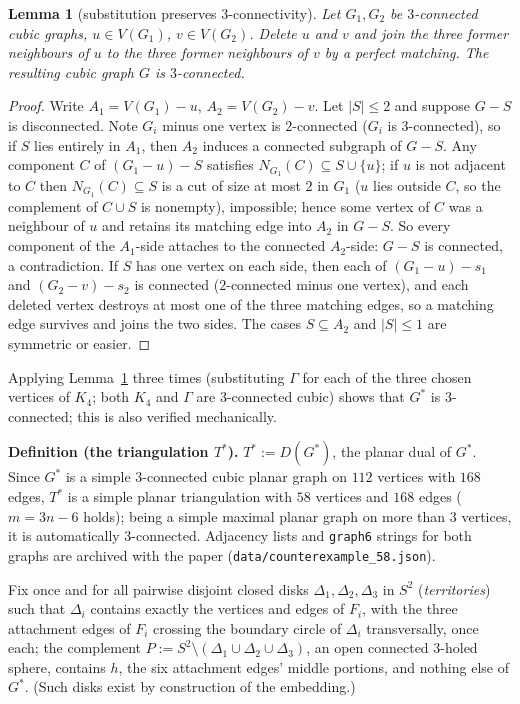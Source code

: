 \documentclass[11pt]{article}
\newtheorem{lemma}[theorem]{Lemma}
\theoremstyle{remark}
\begin{document}
\begin{lemma}[substitution preserves $3$-connectivity]\label{lem:sub}
Let $G_1,G_2$ be $3$-connected cubic graphs, $u\in V(G_1)$,
$v\in V(G_2)$. Delete $u$ and $v$ and join the three former neighbours of
$u$ to the three former neighbours of $v$ by a perfect matching. The
resulting cubic graph $G$ is $3$-connected.
\end{lemma}

\begin{proof}
Write $A_1=V(G_1)-u$, $A_2=V(G_2)-v$. Let $|S|\le 2$ and suppose $G-S$ is
disconnected. Note $G_i$ minus one vertex is $2$-connected ($G_i$ is
$3$-connected), so if $S$ lies entirely in $A_1$, then $A_2$ induces a
connected subgraph of $G-S$. Any component $C$ of $(G_1-u)-S$ satisfies
$N_{G_1}(C)\subseteq S\cup\{u\}$; if $u$ is not adjacent to $C$ then
$N_{G_1}(C)\subseteq S$ is a cut of size at most $2$ in $G_1$ ($u$ lies
outside $C$, so the complement of $C\cup S$ is nonempty), impossible;
hence some vertex of $C$ was a neighbour of $u$ and retains its matching
edge into $A_2$ in $G-S$. So every component of the $A_1$-side attaches
to the connected $A_2$-side: $G-S$ is connected, a contradiction. If $S$
has one vertex on each side, then each of $(G_1-u)-s_1$ and
$(G_2-v)-s_2$ is connected ($2$-connected minus one vertex), and each
deleted vertex destroys at most one of the three matching edges, so a
matching edge survives and joins the two sides. The cases
$S\subseteq A_2$ and $|S|\le 1$ are symmetric or easier.
\end{proof}

Applying Lemma~\ref{lem:sub} three times (substituting $\Gamma$ for each
of the three chosen vertices of $K_4$; both $K_4$ and $\Gamma$ are
$3$-connected cubic) shows that $G^{*}$ is $3$-connected; this is also
verified mechanically.

\medskip
\noindent\textbf{Definition (the triangulation $T^{*}$).}
$T^{*}:=D(G^{*})$, the planar dual of $G^{*}$. Since $G^{*}$ is a simple
$3$-connected cubic planar graph on $112$ vertices with $168$ edges,
$T^{*}$ is a simple planar triangulation with $58$ vertices and $168$
edges ($m=3n-6$ holds); being a simple maximal planar graph on more
than $3$ vertices, it is automatically $3$-connected. Adjacency lists and
\texttt{graph6} strings for both graphs are archived with the paper
(\texttt{data/counterexample\_58.json}).

Fix once and for all pairwise disjoint closed disks
$\Delta_1,\Delta_2,\Delta_3$ in $S^2$ (\emph{territories}) such that
$\Delta_i$ contains exactly the vertices and edges of $F_i$, with the
three attachment edges of $F_i$ crossing the boundary circle of
$\Delta_i$ transversally, once each; the complement
$P:=S^2\setminus(\Delta_1\cup\Delta_2\cup\Delta_3)$, an open connected
$3$-holed sphere, contains $h$, the six attachment edges' middle
portions, and nothing else of $G^{*}$. (Such disks exist by construction
of the embedding.)
\end{document}
